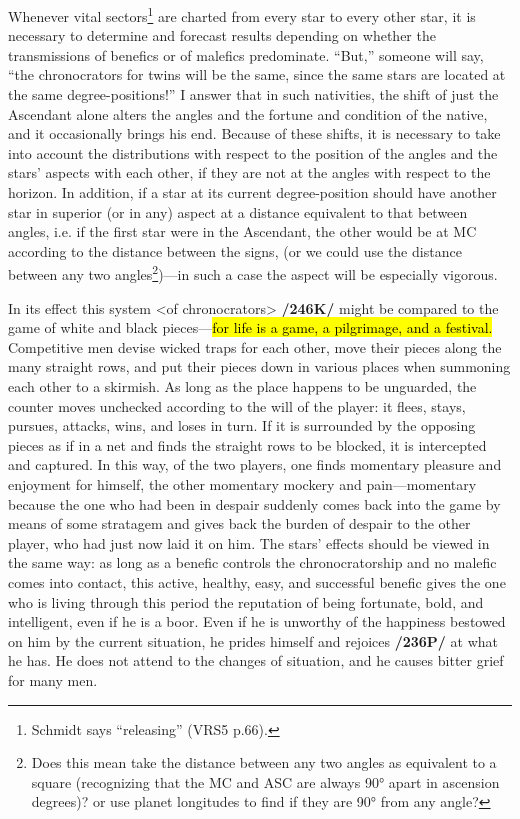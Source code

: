  
Whenever vital sectors\footnote{Schmidt says ``releasing'' (VRS5 p.66).} are charted from every star to every other star, it is necessary to determine and forecast results depending on whether the transmissions of benefics or of malefics predominate. “But,” someone will say, “the chronocrators for twins will be the same, since the same stars are located at the same degree-positions!” I answer that in such nativities, the shift of just the Ascendant alone alters the angles and the fortune and condition of the native, and it occasionally brings his end. Because of these shifts, it is necessary to take into account the distributions with respect to the position of the angles and the stars’ aspects with each other, if they are not at the angles with respect to the horizon. In addition, if a star at its current degree-position should have another star in superior (or in any) aspect at a distance equivalent to that between angles, i.e. if the first star were in the Ascendant, the other would be at MC according to the distance between the signs, (or we could use the distance between any two angles\footnote{Does this mean take the distance between any two angles as equivalent to a square (recognizing that the MC and ASC are always 90° apart in ascension degrees)? or use planet longitudes to find if they are 90° from any angle?})—in such a case the aspect will be especially vigorous.

In its effect this system <of chronocrators> \textbf{/246K/} might be compared to the game of white and black pieces—\hl{for life is a game, a pilgrimage, and a festival.} Competitive men devise wicked traps for each other, move their pieces along the many straight rows, and put their pieces down in various places when summoning each other to a skirmish. As long as the place happens to be unguarded, the counter moves unchecked according to the will of the player: it flees, stays, pursues, attacks, wins, and loses in turn. If it is surrounded by the opposing pieces as if in a net and finds the straight rows to be blocked, it is intercepted and captured. In this way, of the two players, one finds momentary pleasure and enjoyment for himself, the other momentary mockery and pain—momentary because the one who had been in despair suddenly comes back into the game by means of some stratagem and gives back the burden of despair to the other player, who had just now laid it on him. The stars’ effects should be viewed in the same way: as long as a benefic controls the chronocratorship
and no malefic comes into contact, this active, healthy, easy, and successful benefic gives the one who is living through this period the reputation of being fortunate, bold, and intelligent, even if he is a boor.
Even if he is unworthy of the happiness bestowed on him by the current situation, he prides himself and rejoices \textbf{/236P/} at what he has. He does not attend to the changes of situation, and he causes bitter grief for many men. 

